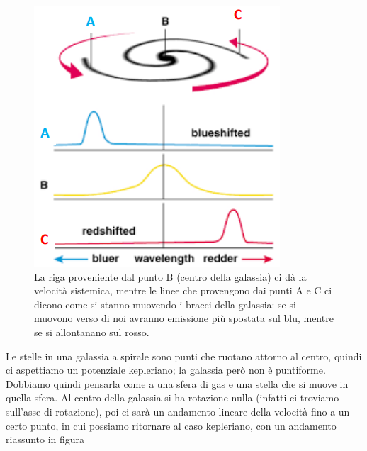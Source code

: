\begin{figure}
    \centering
    \includegraphics[width = 0.4 \textwidth]{immagini/effetto-doppler.png}
    \caption{La riga proveniente dal punto B (centro della galassia) ci dà la velocità sistemica, mentre le linee che provengono dai punti A e C ci dicono come si stanno muovendo i bracci della galassia: se si muovono verso di noi avranno emissione più spostata sul blu, mentre se si allontanano sul rosso.}
    \label{fig:effetto-doppler-galassie}
\end{figure}

Le stelle in una galassia a spirale sono punti che ruotano attorno al centro, quindi  ci aspettiamo un potenziale kepleriano; la galassia però non è puntiforme. Dobbiamo quindi pensarla come a una sfera di gas e una stella che si muove in quella sfera. Al centro della galassia si ha rotazione nulla (infatti ci troviamo sull'asse di rotazione), poi ci sarà un andamento lineare della velocità fino a un certo punto, in cui possiamo ritornare al caso kepleriano, con un andamento riassunto in figura 

